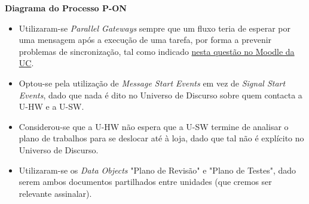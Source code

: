 \documentclass[12pt,a4paper]{article}
\begin{document}
\begin{tcolorbox}[enhanced jigsaw,colback=bg,boxrule=0pt,arc=4pt]
  \begin{small}
    \textbf{Diagrama do Processo P-ON}
  \end{small}
  \begin{itemize}
    \item Utilizaram-se \textit{Parallel Gateways} sempre que um fluxo teria de esperar por uma
          mensagem após a execução de uma tarefa, por forma a prevenir problemas de sincronização,
          tal como indicado \href{https://moodle.dei.tecnico.ulisboa.pt/mod/forum/discuss.php?d=7213}{nesta questão no Moodle da UC}.
    \item Optou-se pela utilização de \textit{Message Start Events} em vez de \textit{Signal Start Events}, dado que nada é dito
          no Universo de Discurso sobre quem contacta a U-HW e a U-SW.
    \item Considerou-se que a U-HW não espera que a U-SW termine de analisar o plano
          de trabalhos para se deslocar até à loja, dado que tal não é explícito no Universo de Discurso.
    \item Utilizaram-se os \textit{Data Objects} "Plano de Revisão" e "Plano de Testes",
          dado serem ambos documentos partilhados entre unidades (que cremos ser relevante assinalar).
  \end{itemize}
\end{tcolorbox}

\begin{landscape}
  \begin{center}
    
  \end{center}
\end{landscape}

\begin{landscape}
  \begin{center}
    
  \end{center}
\end{landscape}

\begin{landscape}
  \begin{center}
    
  \end{center}
\end{landscape}
\end{document}
